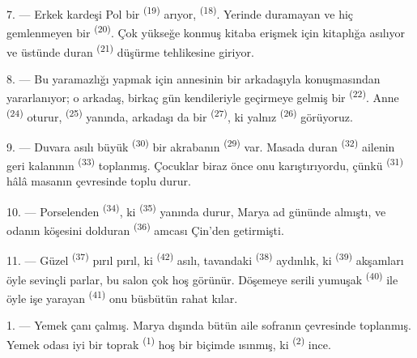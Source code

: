 \VUsaut{5.0mm}
\VUsaut{3.0mm}

7. --- Erkek kardeşi Pol bir  \textsuperscript{(19)} arıyor,
 \textsuperscript{(18)}. Yerinde duramayan ve hiç
gemlenmeyen bir  \textsuperscript{(20)}. Çok yükseğe konmuş
kitaba erişmek için kitaplığa asılıyor ve üstünde duran 
\textsuperscript{(21)} düşürme tehlikesine giriyor.

8. --- Bu yaramazlığı yapmak için annesinin bir arkadaşıyla konuşmasından
yararlanıyor; o arkadaş, birkaç gün kendileriyle geçirmeye gelmiş bir
 \textsuperscript{(22)}. Anne 
\textsuperscript{(24)} oturur,  \textsuperscript{(25)}
yanında, arkadaşı da bir  \textsuperscript{(27)}, ki yalnız
 \textsuperscript{(26)} görüyoruz.

9. --- Duvara asılı büyük  \textsuperscript{(30)} bir
akrabanın  \textsuperscript{(29)} var. Masada duran
 \textsuperscript{(32)} ailenin geri kalanının
 \textsuperscript{(33)} toplanmış. Çocuklar biraz önce
onu karıştırıyordu, çünkü  \textsuperscript{(31)} hâlâ
masanın çevresinde toplu durur.

10. --- Porselenden  \textsuperscript{(34)}, ki
 \textsuperscript{(35)} yanında durur, Marya ad
gününde almıştı, ve odanın köşesini dolduran 
\textsuperscript{(36)} amcası Çin'den getirmişti.

11. --- Güzel  \textsuperscript{(37)} pırıl pırıl, ki
 \textsuperscript{(42)} asılı, tavandaki 
\textsuperscript{(38)} aydınlık, ki 
\textsuperscript{(39)} akşamları öyle sevinçli parlar, bu salon çok hoş
görünür. Döşemeye serili yumuşak  \textsuperscript{(40)} ile öyle
işe yarayan  \textsuperscript{(41)} onu büsbütün rahat
kılar.

\VUsaut{3.6mm}
\VUsaut{3.0mm}

1. --- Yemek çanı çalmış. Marya dışında bütün aile sofranın çevresinde
toplanmış. Yemek odası iyi bir toprak  \textsuperscript{(1)} hoş bir
biçimde ısınmış, ki  \textsuperscript{(2)} ince.

